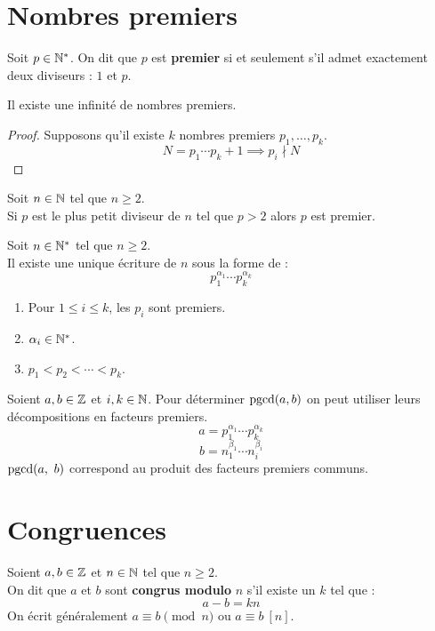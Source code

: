 \section{Nombres premiers}
\begin{definition}
	Soit $p \in \mathbb{N}^*$. On dit que $p$ est \textbf{premier} si et seulement s'il admet exactement deux diviseurs : $1$ et $p$.
\end{definition}

\begin{theorem}
	Il existe une infinité de nombres premiers.
\end{theorem}

\begin{proof}
	Supposons qu'il existe $k$ nombres premiers $p_1, \ldots, p_k$.
	\[ N = p_1 \cdots p_k + 1 \implies p_i \nmid N \]
\end{proof}

\begin{lemma}
	Soit $n \in \mathbb{N}$ tel que $n \geq 2$.
	\\
	Si $p$ est le plus petit diviseur de $n$ tel que $p > 2$ alors $p$ est premier.
\end{lemma}

\begin{theorem}
	Soit $n \in \mathbb{N}^*$ tel que $n \geq 2$. 
	\\
	Il existe une unique écriture de $n$ sous la forme de :
	\[ p_1^{\alpha_1} \cdots p_k^{\alpha_k} \]
	\begin{enumerate}
		\item Pour $1 \leq i \leq k$, les $p_i$ sont premiers.
		\item $\alpha_i \in \mathbb{N}^*$.
		\item $p_1 < p_2 < \cdots < p_k$.
	\end{enumerate}
\end{theorem}

\begin{proposition}
	Soient $a, b \in \mathbb{Z}$ et $i, k \in \mathbb{N}$. Pour déterminer $\operatorname{pgcd}(a, b)$ on peut utiliser leurs décompositions en facteurs premiers.
	\[ a = p_1^{\alpha_1} \cdots p_k^{\alpha_k} \]
	\[ b = n_1^{\beta_1} \cdots n_i^{\beta_i} \]
	$\operatorname{pgcd}(a,\ b)$ correspond au produit des facteurs premiers communs.
\end{proposition}

\section{Congruences}
\begin{definition}
	Soient $a, b \in \mathbb{Z}$ et $n \in \mathbb{N}$ tel que $n \geq 2$.
	\\
	On dit que $a$ et $b$ sont \textbf{congrus modulo} $n$ s'il existe un $k$ tel que :
	\[ a - b = k n \]
	On écrit généralement $a \equiv b \pmod n$ ou $a \equiv b \ [n]$.
\end{definition}

